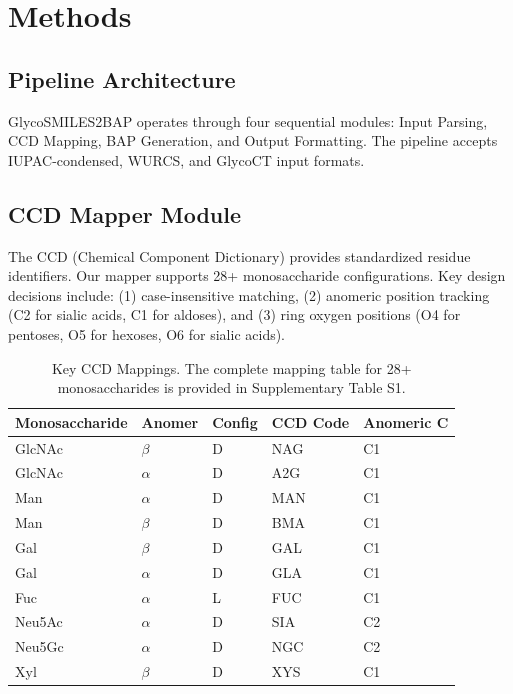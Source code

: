 \section{Methods}

\subsection{Pipeline Architecture}

GlycoSMILES2BAP operates through four sequential modules: Input Parsing, CCD Mapping, BAP Generation, and Output Formatting. The pipeline accepts IUPAC-condensed, WURCS, and GlycoCT input formats.

\subsection{CCD Mapper Module}

The CCD (Chemical Component Dictionary) provides standardized residue identifiers. Our mapper supports 28+ monosaccharide configurations. Key design decisions include: (1) case-insensitive matching, (2) anomeric position tracking (C2 for sialic acids, C1 for aldoses), and (3) ring oxygen positions (O4 for pentoses, O5 for hexoses, O6 for sialic acids).

\begin{table}[h]
\centering
\caption{Key CCD Mappings. The complete mapping table for 28+ monosaccharides is provided in Supplementary Table S1.}
\begin{tabular}{lllll}
\toprule
Monosaccharide & Anomer & Config & CCD Code & Anomeric C \\
\midrule
GlcNAc & $\beta$ & D & NAG & C1 \\
GlcNAc & $\alpha$ & D & A2G & C1 \\
Man & $\alpha$ & D & MAN & C1 \\
Man & $\beta$ & D & BMA & C1 \\
Gal & $\beta$ & D & GAL & C1 \\
Gal & $\alpha$ & D & GLA & C1 \\
Fuc & $\alpha$ & L & FUC & C1 \\
Neu5Ac & $\alpha$ & D & SIA & C2 \\
Neu5Gc & $\alpha$ & D & NGC & C2 \\
Xyl & $\beta$ & D & XYS & C1 \\
\bottomrule
\end{tabular}
\label{tab:ccd_mapping}
\end{table}

